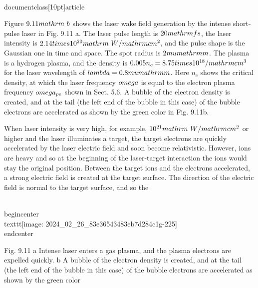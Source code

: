\\documentclass[10pt]{article}
\begin{document}
{{{{{{Figure $9.11 \\mathrm{~b}$ shows the laser wake field generation by the intense short-pulse laser in Fig. 9.11 a. The laser pulse length is $20 \\mathrm{fs}$, the laser intensity is $2.14 \\times 10^{20} \\mathrm{~W} / \\mathrm{cm}^{2}$, and the pulse shape is the Gaussian one in time and space. The spot radius is $2 \\mu \\mathrm{m}$. The plasma is a hydrogen plasma, and the density is $0.005 n_{c}=8.75 \\times 10^{18} / \\mathrm{cm}^{3}$ for the laser wavelength of $\\lambda=0.8 \\mu \\mathrm{m}$. Here $n_{c}$ shows the critical density, at which the laser frequency $\\omega$ is equal to the electron plasma frequency $\\omega_{p e}$ shown in Sect. 5.6. A bubble of the electron density is created, and at the tail (the left end of the bubble in this case) of the bubble electrons are accelerated as shown by the green color in Fig. 9.11b.

When laser intensity is very high, for example, $10^{21} \\mathrm{~W} / \\mathrm{cm}^{2}$ or higher and the laser illuminates a target, the target electrons are quickly accelerated by the laser electric field and soon become relativistic. However, ions are heavy and so at the beginning of the laser-target interaction the ions would stay the original position. Between the target ions and the electrons accelerated, a strong electric field is created at the target surface. The direction of the electric field is normal to the target surface, and so the

\\begin{center}
\\texttt{[image: 2024\_02\_26\_83e36543483eb7d284c1g-225]}
\\end{center}

Fig. 9.11 a Intense laser enters a gas plasma, and the plasma electrons are expelled quickly. b A bubble of the electron density is created, and at the tail (the left end of the bubble in this case) of the bubble electrons are accelerated as shown by the green color

}}}}}}
\end{document}
